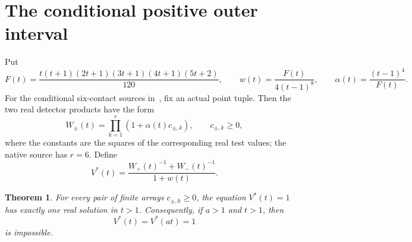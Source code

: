 \documentclass[11pt,a4paper]{article}
\newtheorem{theorem}{Theorem}[section]
\begin{document}
\section{The conditional positive outer interval}
\label{sec:unit-trace-positive-interval}

Put
\[
 F(t)=\frac{t(t+1)(2t+1)(3t+1)(4t+1)(5t+2)}{120},\qquad
 w(t)=\frac{F(t)}{4(t-1)^8},\qquad
 \alpha(t)=\frac{(t-1)^4}{F(t)}.
\]
For the conditional six-contact sources in~\cite{Conditional}, fix an actual point tuple. Then the
two real detector products have the form
\[
 W_\pm(t)=\prod_{k=1}^{r}(1+\alpha(t)c_{\pm,k}),
 \qquad c_{\pm,k}\ge0,
\]
where the constants are the squares of the corresponding real test
values; the native source has $r=6$. Define
\[
 V^*(t)=\frac{W_+(t)^{-1}+W_-(t)^{-1}}{1+w(t)}.
\]

\begin{theorem}\label{thm:unit-trace-positive-unique}
For every pair of finite arrays $c_{\pm,k}\ge0$, the equation
$V^*(t)=1$ has exactly one real solution in $t>1$.
Consequently, if $a>1$ and $t>1$, then
\[
                         V^*(t)=V^*(at)=1
\]
is impossible.
\end{theorem}
\end{document}
